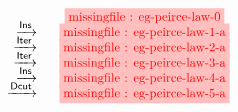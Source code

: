 \setlength{\fboxsep}{2pt}
\setlength{\arraycolsep}{0pt}
\newcommand{\vsp}{\vspace{-0.5em}}
\newcommand{\stkf}{\tikzfig{0.9}{0.45}}
$$
\begin{array}{r@{\quad}c@{\vsp}}
                             &\stkf{eg-peirce-law-0} \\
       \xstep{\mathsf{Ins}}  &\stkf{eg-peirce-law-1-a} \\
       \xstep{\mathsf{Iter}} &\stkf{eg-peirce-law-2-a} \\
       \xstep{\mathsf{Iter}} &\stkf{eg-peirce-law-3-a} \\
       \xstep{\mathsf{Ins}}  &\stkf{eg-peirce-law-4-a} \\
       \xstep{\mathsf{Dcut}} &\stkf{eg-peirce-law-5-a} \\
\end{array}
$$
